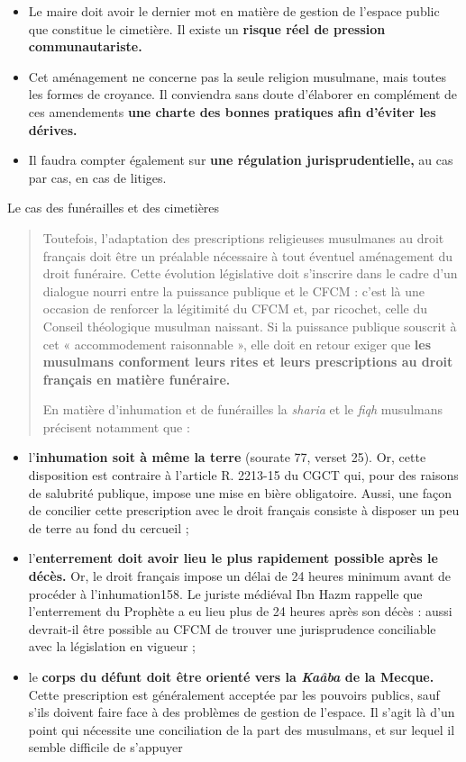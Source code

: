 \begin{itemize}
\item
  Le maire doit avoir le dernier mot en matière de gestion de l'espace
  public que constitue le cimetière. Il existe un \textbf{risque réel de
  pression communautariste.}
\item
  Cet aménagement ne concerne pas la seule religion musulmane, mais
  toutes les formes de croyance. Il conviendra sans doute d'élaborer en
  complément de ces amendements \textbf{une charte des bonnes pratiques
  afin d'éviter les dérives.}
\item
  Il faudra compter également sur \textbf{une régulation
  jurisprudentielle,} au cas par cas, en cas de litiges.
\end{itemize}

Le cas des funérailles et des cimetières

\begin{quote}
Toutefois, l'adaptation des prescriptions religieuses musulmanes au
droit français doit être un préalable nécessaire à tout éventuel
aménagement du droit funéraire. Cette évolution législative doit
s'inscrire dans le cadre d'un dialogue nourri entre la puissance
publique et le CFCM : c'est là une occasion de renforcer la légitimité
du CFCM et, par ricochet, celle du Conseil théologique musulman
naissant. Si la puissance publique souscrit à cet « accommodement
raisonnable », elle doit en retour exiger que \textbf{les musulmans
conforment leurs rites et leurs prescriptions au droit français en
matière funéraire.}

En matière d'inhumation et de funérailles la \emph{sharia} et le
\emph{fiqh} musulmans précisent notamment que :
\end{quote}

\begin{itemize}
\item
  l'\textbf{inhumation soit à même la terre} (sourate 77, verset 25).
  Or, cette disposition est contraire à l'article R. 2213-15 du CGCT
  qui, pour des raisons de salubrité publique, impose une mise en bière
  obligatoire. Aussi, une façon de concilier cette prescription avec le
  droit français consiste à disposer un peu de terre au fond du cercueil
  ;
\item
  l'\textbf{enterrement doit avoir lieu le plus rapidement possible
  après le décès.} Or, le droit français impose un délai de 24 heures
  minimum avant de procéder à l'inhumation158. Le juriste médiéval Ibn
  Hazm rappelle que l'enterrement du Prophète a eu lieu plus de 24
  heures après son décès : aussi devrait-il être possible au CFCM de
  trouver une jurisprudence conciliable avec la législation en vigueur ;
\item
  le \textbf{corps du défunt doit être orienté vers la \emph{Kaâba} de
  la Mecque.} Cette prescription est généralement acceptée par les
  pouvoirs publics, sauf s'ils doivent faire face à des problèmes de
  gestion de l'espace. Il s'agit là d'un point qui nécessite une
  conciliation de la part des musulmans, et sur lequel il semble
  difficile de s'appuyer
\end{itemize}

